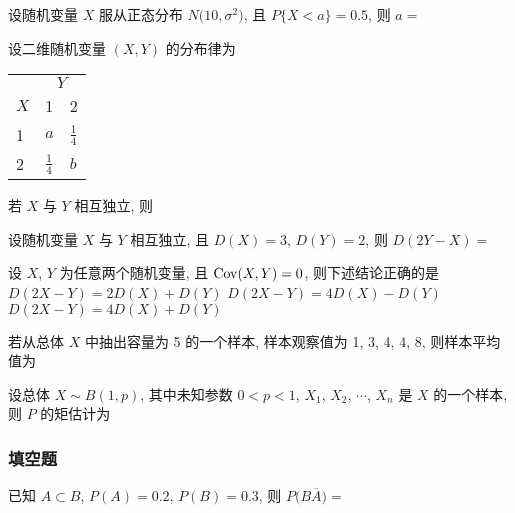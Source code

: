 \begin{ti}
	设随机变量 $X$ 服从正态分布 $N\bigl( 10,\sigma^2 \bigr)$, 且 $P\{ X < a \} = 0.5$, 则 $a =$ \kuo{}
\end{ti}

\begin{ti}
	设二维随机变量 $(X,Y)$ 的分布律为
	\begin{center}
		\begin{tabularx}{0.8\textwidth}{Z*{2}{Z}}
			\hline
			 &  \\
			$X$ & 1 & 2 \\
			 & $a$ & $\frac{1}{4}$ \\
			2 & $\frac{1}{4}$ & $b$ \\
			\hline
		\end{tabularx}
	\end{center}
	若 $X$ 与 $Y$ 相互独立, 则 \kuo{}
\end{ti}

\begin{ti}
	设随机变量 $X$ 与 $Y$ 相互独立, 且 $D(X) = 3$, $D(Y) = 2$, 则 $D(2Y-X) =$ \kuo{}
\end{ti}

\begin{ti}
	设 $X$, $Y$ 为任意两个随机变量, 且 $\operatorname{Cov}(X,Y) = 0$, 则下述结论正确的是 \kuo{}
	{$D(2X-Y) = 2D(X) + D(Y)$}
	{$D(2X-Y) = 4D(X) - D(Y)$}
	{$D(2X-Y) = 4D(X) + D(Y)$}
\end{ti}

\begin{ti}
	若从总体 $X$ 中抽出容量为 5 的一个样本, 样本观察值为 1, 3, 4, 4, 8, 则样本平均值为 \kuo{}
\end{ti}

\begin{ti}
	设总体 $X \sim B(1,p)$, 其中未知参数 $0<p<1$, $X_1$, $X_2$, $\cdots$, $X_n$ 是 $X$ 的一个样本, 则 $P$ 的矩估计为 \kuo{}
\end{ti}

\subsubsection{填空题}
\begin{ti}
	已知 $A \subset B$, $P(A) = 0.2$, $P(B) = 0.3$, 则 $P\bigl( B \overline{A} \bigr) =$ \hua
\end{ti}

